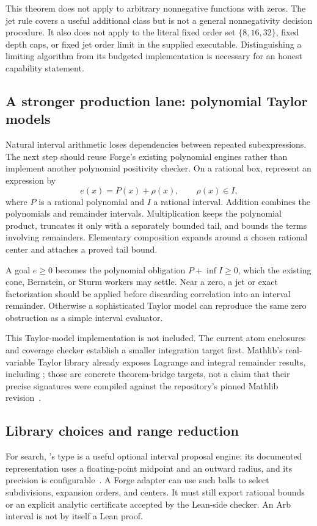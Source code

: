 This theorem does not apply to arbitrary nonnegative functions with zeros. The jet rule covers a useful additional class but is not a general nonnegativity decision procedure. It also does not apply to the literal fixed order set \(\{8,16,32\}\), fixed depth caps, or fixed jet order limit in the supplied executable. Distinguishing a limiting algorithm from its budgeted implementation is necessary for an honest capability statement.

\subsection{A stronger production lane: polynomial Taylor models}
Natural interval arithmetic loses dependencies between repeated subexpressions. The next step should reuse Forge's existing polynomial engines rather than implement another polynomial positivity checker. On a rational box, represent an expression by
\[
 e(x)=P(x)+\rho(x),\qquad \rho(x)\in I,
\]
where \(P\) is a rational polynomial and \(I\) a rational interval. Addition combines the polynomials and remainder intervals. Multiplication keeps the polynomial product, truncates it only with a separately bounded tail, and bounds the terms involving remainders. Elementary composition expands around a chosen rational center and attaches a proved tail bound.

A goal \(e\ge0\) becomes the polynomial obligation \(P+\inf I\ge0\), which the existing cone, Bernstein, or Sturm workers may settle. Near a zero, a jet or exact factorization should be applied before discarding correlation into an interval remainder. Otherwise a sophisticated Taylor model can reproduce the same zero obstruction as a simple interval evaluator.

This Taylor-model implementation is not included. The current atom enclosures and coverage checker establish a smaller integration target first. Mathlib's real-variable Taylor library already exposes Lagrange and integral remainder results, including ; those are concrete theorem-bridge targets, not a claim that their precise signatures were compiled against the repository's pinned Mathlib revision~\cite{mathlib-taylor}.

\subsection{Library choices and range reduction}
For search, 's  type is a useful optional interval proposal engine: its documented representation uses a floating-point midpoint and an outward radius, and its precision is configurable~\cite{arb}. A Forge adapter can use such balls to select subdivisions, expansion orders, and centers. It must still export rational bounds or an explicit analytic certificate accepted by the Lean-side checker. An Arb interval is not by itself a Lean proof.

